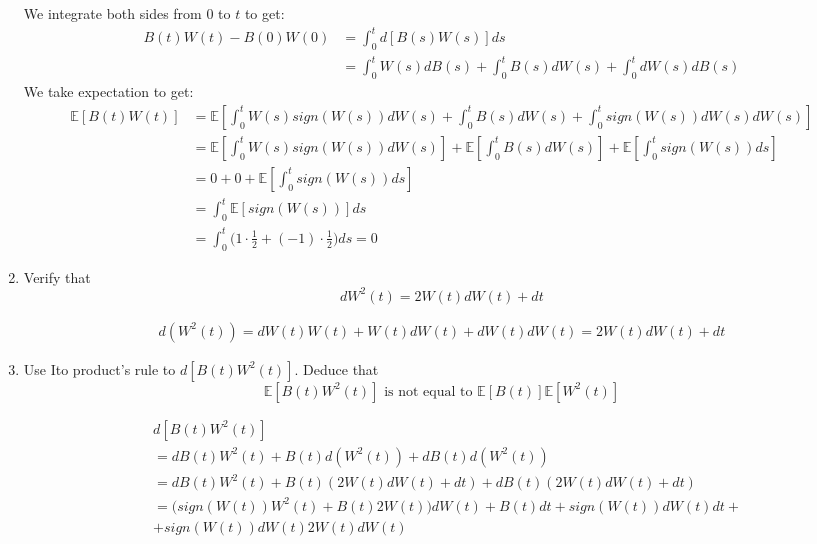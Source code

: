 \documentclass[12pt,twoside, letter]{exam}
\theoremstyle{definition}
\newcommand{\ee}{\mathbb{E}}
\begin{document}
\begin{enumerate}
\begin{solution}
        We integrate both sides from $0$ to $t$ to get:
        \begin{align*}
          B(t)W(t) - B(0)W(0) &= \int^t_0 d[B(s)W(s)] ds \\
          &= \int^t_0 W(s)dB(s) + \int^t_0 B(s) dW(s) + \int^t_0 dW(s)dB(s)
        \end{align*}
        We take expectation to get:
        \begin{align*}
          \ee[B(t)W(t)] &= \ee[\int^t_0 W(s)sign(W(s)) dW(s) + \int^t_0 B(s) dW(s) + \int^t_0 sign(W(s))dW(s)dW(s)] \\
          &= \ee[\int^t_0 W(s)sign(W(s)) dW(s)] + \ee[\int^t_0 B(s) dW(s)] + \ee[\int^t_0 sign(W(s)) ds] \\
          &= 0 + 0 + \ee[\int^t_0 sign(W(s)) ds] \\
          &= \int^t_0 \ee[sign(W(s))] ds \\
          &= \int^t_0 \big(1\cdot \frac{1}{2} + (-1) \cdot \frac{1}{2} \big) ds = 0
        \end{align*}
      \end{solution}
    \item Verify that
      \begin{equation*}
        dW^2(t) = 2W(t)dW(t) + dt
      \end{equation*}
      \begin{solution}
        \begin{align*}
          d(W^2(t)) = dW(t)W(t) + W(t)dW(t) + dW(t)dW(t) = 2W(t)dW(t) + dt
        \end{align*}
      \end{solution}
    \item Use Ito product's rule to $d[B(t)W^2(t)]$. Deduce that
      \begin{equation*}
        \ee[B(t)W^2(t)] \text{ is not equal to } \ee[B(t)]\ee[W^2(t)]
      \end{equation*}
      \begin{solution}
        \begin{align*}
          &d[B(t)W^2(t)] \\
          &= dB(t)W^2(t) + B(t)d(W^2(t)) + dB(t)d(W^2(t))\\
          &= dB(t)W^2(t) + B(t)(2W(t)dW(t) + dt) + dB(t)(2W(t)dW(t) + dt) \\
          &=  \bigg(sign(W(t))W^2(t) + B(t)2W(t)\bigg) dW(t) + B(t)dt + sign(W(t))dW(t)dt + \\
          &+ sign(W(t))dW(t)2W(t)dW(t) \\

\end{align*}
\end{solution}
\end{enumerate}
\end{document}
